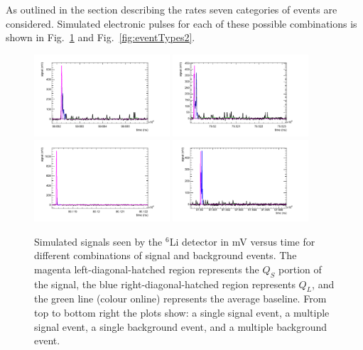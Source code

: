 \documentclass[letter,twocolumn,preprint,3p]{elsarticle}
\begin{document}
As outlined in the section describing the rates seven categories of
events are considered.  Simulated electronic pulses for each of these
possible combinations is shown in Fig.~\ref{fig:eventTypes} and
Fig.~\ref{fig:eventTypes2}.

\begin{figure}[!htpb]
\centering
\includegraphics[width=0.45\textwidth]{figures/signal1.pdf}
\includegraphics[width=0.45\textwidth]{figures/mixed1.pdf}
\includegraphics[width=0.45\textwidth]{figures/gamma1.pdf}
\includegraphics[width=0.45\textwidth]{figures/gammapileup1.pdf}
\caption{ Simulated signals seen by the $^{6}$Li detector in mV versus
  time for different combinations of signal and background events.
  The magenta left-diagonal-hatched region represents the $Q_S$
  portion of the signal, the blue right-diagonal-hatched region
  represents $Q_L$, and the green line (colour online) represents the
  average baseline.  From top to bottom right the plots show: a single
  signal event, a multiple signal event, a single background event,
  and a multiple background event. }\label{fig:eventTypes}
\end{figure}
\end{document}
